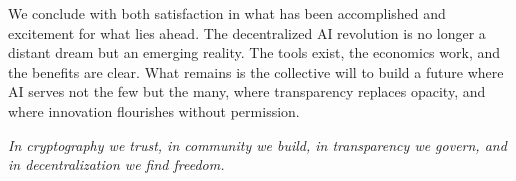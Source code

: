 We conclude with both satisfaction in what has been accomplished and excitement for what lies ahead. The decentralized AI revolution is no longer a distant dream but an emerging reality. The tools exist, the economics work, and the benefits are clear. What remains is the collective will to build a future where AI serves not the few but the many, where transparency replaces opacity, and where innovation flourishes without permission.

\textit{In cryptography we trust, in community we build, in transparency we govern, and in decentralization we find freedom.}
